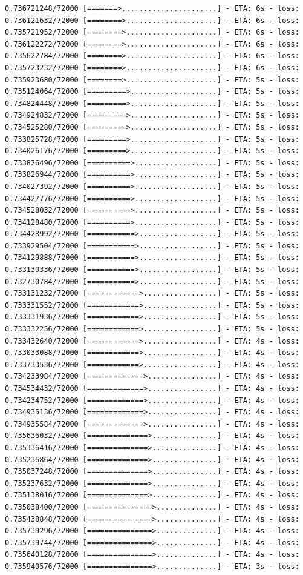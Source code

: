 \documentclass[12pt,fleqn]{article}\usepackage{../../common}
\begin{document}
\begin{verbatim}
0.736721248/72000 [=======>......................] - ETA: 6s - loss: 0.736121632/72000 [========>.....................] - ETA: 6s - loss: 0.735721952/72000 [========>.....................] - ETA: 6s - loss: 0.736122272/72000 [========>.....................] - ETA: 6s - loss: 0.735622784/72000 [========>.....................] - ETA: 6s - loss: 0.735723232/72000 [========>.....................] - ETA: 6s - loss: 0.735923680/72000 [========>.....................] - ETA: 5s - loss: 0.735124064/72000 [=========>....................] - ETA: 5s - loss: 0.734824448/72000 [=========>....................] - ETA: 5s - loss: 0.734924832/72000 [=========>....................] - ETA: 5s - loss: 0.734525280/72000 [=========>....................] - ETA: 5s - loss: 0.733825728/72000 [=========>....................] - ETA: 5s - loss: 0.734026176/72000 [=========>....................] - ETA: 5s - loss: 0.733826496/72000 [==========>...................] - ETA: 5s - loss: 0.733826944/72000 [==========>...................] - ETA: 5s - loss: 0.734027392/72000 [==========>...................] - ETA: 5s - loss: 0.734427776/72000 [==========>...................] - ETA: 5s - loss: 0.734528032/72000 [==========>...................] - ETA: 5s - loss: 0.734128480/72000 [==========>...................] - ETA: 5s - loss: 0.734428992/72000 [===========>..................] - ETA: 5s - loss: 0.733929504/72000 [===========>..................] - ETA: 5s - loss: 0.734129888/72000 [===========>..................] - ETA: 5s - loss: 0.733130336/72000 [===========>..................] - ETA: 5s - loss: 0.732730784/72000 [===========>..................] - ETA: 5s - loss: 0.733131232/72000 [============>.................] - ETA: 5s - loss: 0.733331552/72000 [============>.................] - ETA: 5s - loss: 0.733331936/72000 [============>.................] - ETA: 5s - loss: 0.733332256/72000 [============>.................] - ETA: 5s - loss: 0.733432640/72000 [============>.................] - ETA: 4s - loss: 0.733033088/72000 [============>.................] - ETA: 4s - loss: 0.733733536/72000 [============>.................] - ETA: 4s - loss: 0.734233984/72000 [=============>................] - ETA: 4s - loss: 0.734534432/72000 [=============>................] - ETA: 4s - loss: 0.734234752/72000 [=============>................] - ETA: 4s - loss: 0.734935136/72000 [=============>................] - ETA: 4s - loss: 0.734935584/72000 [=============>................] - ETA: 4s - loss: 0.735636032/72000 [==============>...............] - ETA: 4s - loss: 0.735336416/72000 [==============>...............] - ETA: 4s - loss: 0.735236864/72000 [==============>...............] - ETA: 4s - loss: 0.735037248/72000 [==============>...............] - ETA: 4s - loss: 0.735237632/72000 [==============>...............] - ETA: 4s - loss: 0.735138016/72000 [==============>...............] - ETA: 4s - loss: 0.735038400/72000 [===============>..............] - ETA: 4s - loss: 0.735438848/72000 [===============>..............] - ETA: 4s - loss: 0.735739296/72000 [===============>..............] - ETA: 4s - loss: 0.735739744/72000 [===============>..............] - ETA: 4s - loss: 0.735640128/72000 [===============>..............] - ETA: 4s - loss: 0.735940576/72000 [===============>..............] - ETA: 3s - loss: 
\end{verbatim}
\end{document}
